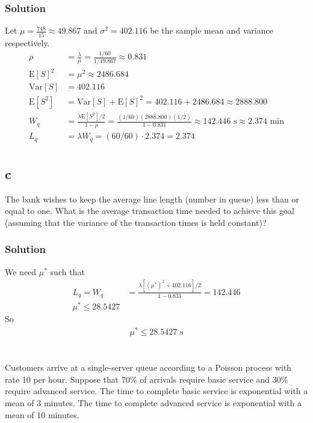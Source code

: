 \documentclass[letterpaper]{amsart}
\begin{document}
\subsubsection*{Solution}
Let $\mu= \frac{748}{15}\approx 49.867$ and $\sigma^2 = 402.116$ be the sample mean and variance respectively.
\begin{align*}
  \rho &= \frac{\lambda}{\mu} = \frac{1/60}{1/49.867} \approx 0.831\\
  \text{E}[S]^2 &= \mu^2 \approx 2486.684 \\
  \text{Var}[S] &= 402.116 \\
  \text{E}[S^2] &= \text{Var}[S] + \text{E}[S]^2
                  = 402.116 + 2486.684 \approx 2888.800\\
  W_q&=\frac{\lambda\text{E}[S^2]/2}{1-\rho}
       = \frac{(1/60)(2888.800)(1/2)}{1-0.831}
       \approx 142.446\text{ s}
       \approx 2.374\text{ min} \\
  L_q&=\lambda W_q = (60/60) \cdot 2.374 = 2.374\\
\end{align*}

\subsection*{c}
The bank wishes to keep the average line length (number in queue) less
than or equal to one. What is the average transaction time needed to
achieve this goal (assuming that the variance of the transaction times is
held constant)?
\subsubsection*{Solution}
We need $\mu^*$ such that
\begin{align*}
  L_q = W_q&=\frac{\lambda[(\mu^*)^2+402.116]/2}{1-0.831} = 142.446 \\
  \mu^* \leq 28.5427
\end{align*}
So
\begin{align*}
  \mu^* \leq 28.5427\text{ s}
\end{align*}

\section{} %
Customers arrive at a single-server queue according to a Poisson process with rate
10 per hour. Suppose that 70\% of arrivals require basic service and 30\% require
advanced service. The time to complete basic service is exponential with a mean
of 3 minutes. The time to complete advanced service is exponential with a mean
of 10 minutes.
\end{document}
